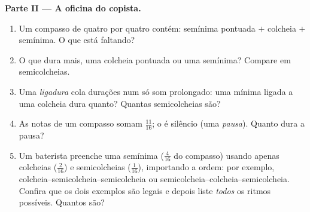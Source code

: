 \begin{problem}
\medskip
\noindent\textbf{Parte II --- A oficina do copista.}
\begin{enumerate}[resume]
  \item Um compasso de quatro por quatro contém: semínima pontuada $+$
        colcheia $+$ semínima. O que está faltando?
  \item O que dura mais, uma colcheia pontuada ou uma semínima? Compare
        em semicolcheias.
  \item Uma \emph{ligadura} cola durações num só som prolongado: uma
        mínima ligada a uma colcheia dura quanto? Quantas semicolcheias
        são?
  \item As notas de um compasso somam $\frac{11}{16}$; o  é
        silêncio (uma \emph{pausa}). Quanto dura a pausa?
  \item Um baterista preenche uma semínima ($\frac{4}{16}$ do compasso)
        usando apenas colcheias ($\frac{2}{16}$) e semicolcheias
        ($\frac{1}{16}$), importando a ordem: por exemplo,
        colcheia--semicolcheia--semicolcheia ou
        semicolcheia--colcheia--semicolcheia. Confira que os dois
        exemplos são legais e depois liste \emph{todos} os ritmos
        possíveis. Quantos são?
\end{enumerate}


\end{problem}
